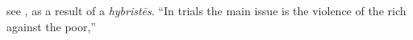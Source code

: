 \item[Violence of the rich against the poor,]

see , as a result of a \emph{hybristēs}. ``In trials the main issue is the violence of the rich against the poor,''
